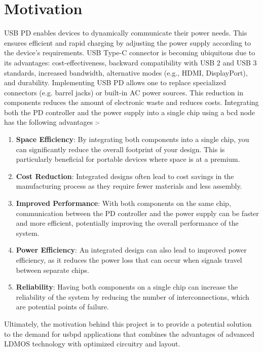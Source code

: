 \section[Motivation]{\textbf{Motivation}}
USB PD enables devices to dynamically communicate their power needs. This ensures efficient and rapid charging by adjusting the power supply according to the device's requirements. USB Type-C connector is becoming ubiquitous due to its advantages: cost-effectiveness, backward compatibility with USB 2 and USB 3 standards, increased bandwidth, alternative modes (e.g., HDMI, DisplayPort), and durability.
Implementing USB PD allows one to replace specialized connectors (e.g. barrel jacks) or built-in AC power sources. This reduction in components reduces the amount of electronic waste and reduces costs. Integrating both the PD controller and the power supply into a single chip using a \gls{bcd} node has the following advantages :-
\begin{enumerate}
    \item \textbf{Space Efficiency}: By integrating both components into a single chip, you can significantly reduce the overall footprint of your design. This is particularly beneficial for portable devices where space is at a premium.
    \item \textbf{Cost Reduction}: Integrated designs often lead to cost savings in the manufacturing process as they require fewer materials and less assembly.
    \item \textbf{Improved Performance}: With both components on the same chip, communication between the PD controller and the power supply can be faster and more efficient, potentially improving the overall performance of the system.
    \item \textbf{Power Efficiency}: An integrated design can also lead to improved power efficiency, as it reduces the power loss that can occur when signals travel between separate chips.
    \item \textbf{Reliability}: Having both components on a single chip can increase the reliability of the system by reducing the number of interconnections, which are potential points of failure.
\end{enumerate}
Ultimately, the motivation behind this project is to provide a potential solution to the demand for \gls{usbpd} applications that combines the advantages of advanced LDMOS technology with optimized circuitry and layout.
